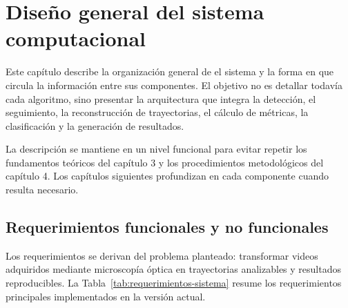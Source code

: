 \chapter{Diseño general del sistema computacional}

Este capítulo describe la organización general de el sistema y la forma en que circula la información entre sus componentes. El objetivo no es detallar todavía cada algoritmo, sino presentar la arquitectura que integra la detección, el seguimiento, la reconstrucción de trayectorias, el cálculo de métricas, la clasificación y la generación de resultados.

La descripción se mantiene en un nivel funcional para evitar repetir los fundamentos teóricos del capítulo 3 y los procedimientos metodológicos del capítulo 4. Los capítulos siguientes profundizan en cada componente cuando resulta necesario.

\section{Requerimientos funcionales y no funcionales}

Los requerimientos se derivan del problema planteado: transformar videos adquiridos mediante microscopía óptica en trayectorias analizables y resultados reproducibles. La Tabla~\ref{tab:requerimientos-sistema} resume los requerimientos principales implementados en la versión actual.


